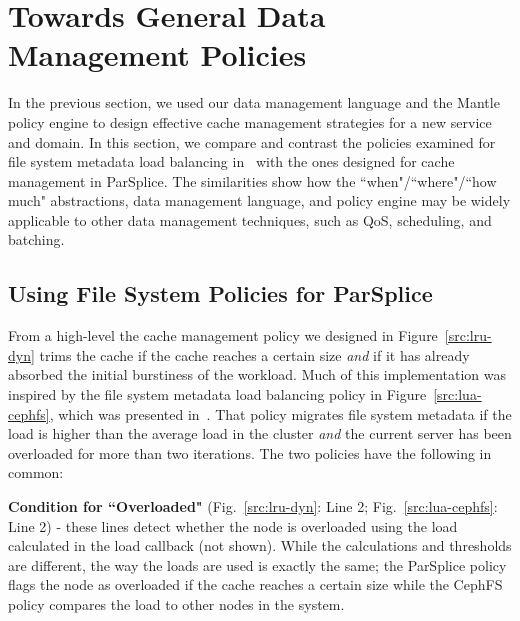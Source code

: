 \section{Towards General Data Management Policies}
\label{sec:scope}


In the previous section, we used our data management language and the Mantle
policy engine to design effective cache management strategies for a new service
and domain. In this section, we compare and contrast the policies examined for
file system metadata load balancing in~\cite{sevilla:sc15-mantle} with the ones
designed for cache management in ParSplice. The similarities show how the
``when"/``where"/``how much" abstractions, data management language, and policy
engine may be widely applicable to other data management techniques, such as
QoS, scheduling, and batching.

\subsection{Using File System Policies for ParSplice}

From a high-level the cache management policy we designed in
Figure~\ref{src:lru-dyn} trims the cache if the cache reaches a certain size
{\it and} if it has already absorbed the initial burstiness of the workload.
Much of this implementation was inspired by the file system metadata load
balancing policy in Figure~\ref{src:lua-cephfs}, which was presented
in~\cite{sevilla:sc15-mantle}. That policy migrates file system metadata if the
load is higher than the average load in the cluster {\it and} the current
server has been overloaded for more than two iterations. The two policies have
the following in common:

\textbf{Condition for ``Overloaded"} (Fig.~\ref{src:lru-dyn}: Line 2;
Fig.~\ref{src:lua-cephfs}: Line 2) - these lines detect whether the node is
overloaded using the load calculated in the load callback (not shown). While
the calculations and thresholds are different, the way the loads are used is
exactly the same; the ParSplice policy flags the node as overloaded if the
cache reaches a certain size while the CephFS policy compares the load to other
nodes in the system.

